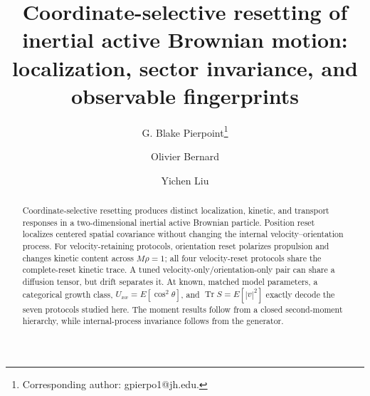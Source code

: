 \documentclass{ws-fnl}
\begin{document}
\title{Coordinate-selective resetting of inertial active Brownian motion: localization, sector invariance, and observable fingerprints}
\author{G. Blake Pierpoint\footnote{Corresponding author: gpierpo1@jh.edu.}}
\address{Department of Biomedical Engineering, Whiting School of Engineering, Johns Hopkins University, 3400 North Charles Street, Baltimore, Maryland 21218, USA\\gpierpo1@jh.edu}
\author{Olivier Bernard}
\address{UFR PhITEM, Universit\'e Grenoble Alpes, 230 rue de la Physique, 38400 Saint-Martin-d'H\`eres, France; Weyl Center for Mathematical Physics, 1235 Pennsylvania Avenue SE, Suite \#1294, Washington, DC 20003, USA\\oli.bernard@weylcenter.org}
\author{Yichen Liu}
\address{Department of Computer Science and Engineering, Shanghai Jiao Tong University, 800 Dongchuan Road, Shanghai 200240, China; Weyl Center for Mathematical Physics, 1235 Pennsylvania Avenue SE, Suite \#1294, Washington, DC 20003, USA\\yichen.liu@weylcenter.org}
\maketitle
\begin{abstract}
Coordinate-selective resetting produces distinct localization, kinetic, and transport responses in a two-dimensional inertial active Brownian particle. Position reset localizes centered spatial covariance without changing the internal velocity--orientation process. For velocity-retaining protocols, orientation reset polarizes propulsion and changes kinetic content across $M\rho=1$; all four velocity-reset protocols share the complete-reset kinetic trace. A tuned velocity-only/orientation-only pair can share a diffusion tensor, but drift separates it. At known, matched model parameters, a categorical growth class, $U_{xx}=E[\cos^2\theta]$, and $\operatorname{Tr}S=E[|v|^2]$ exactly decode the seven protocols studied here. The moment results follow from a closed second-moment hierarchy, while internal-process invariance follows from the generator.
\end{abstract}

\end{document}
